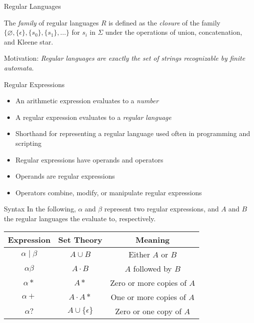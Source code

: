 \documentclass{beamer}
\newcommand{\concat}{\mathbin{\cdot}}
\newcommand{\kstar}{{*}}
\begin{document}
\begin{frame}{Regular Languages}
\begin{definition}
The \textit{family} of regular languages $R$ is defined as the \textit{closure} of the family $\{\varnothing, \{\epsilon\}, \{s_0\}, \{s_1\}, ...\}$ for $s_i$ in $\Sigma$ under the operations of union, concatenation, and Kleene star.
\end{definition}

Motivation: \textit{Regular languages are exactly the set of strings recognizable by finite automata}.
\end{frame}

\begin{frame}{Regular Expressions}
\begin{itemize}
\item An arithmetic expression evaluates to a \textit{number}
\item A regular expression evaluates to a \textit{regular language}
\item Shorthand for representing a regular language used often in programming and scripting
\item Regular expressions have operands and operators
\item Operands are regular expressions
\item Operators combine, modify, or manipulate regular expressions
\end{itemize}
\end{frame}

\begin{frame}{Syntax}
In the following, $\alpha$ and $\beta$ represent two regular expressions, and $A$ and $B$ the regular languages the evaluate to, respectively.

\vspace{0.1in}
\begin{tabular}{c|cc}
Expression & Set Theory & Meaning \\
\hline
$\alpha \mid \beta$ & $A \cup B$ & Either $A$ or $B$ \\
$\alpha \beta$ & $A \concat B$ & $A$ followed by $B$ \\
$\alpha \kstar$ & $A \kstar$ & Zero or more copies of $A$ \\
$\alpha+$ & $A \concat A \kstar$ & One or more copies of $A$ \\
$\alpha?$ & $A \cup \{\epsilon\}$ & Zero or one copy of $A$ \\
\end{tabular}
\end{frame}
\end{document}
